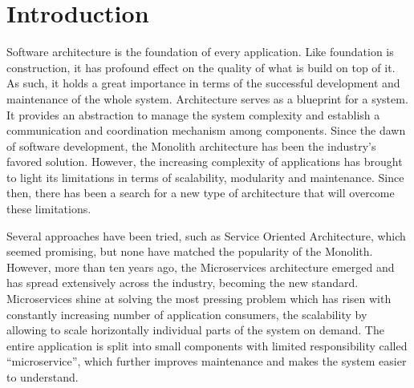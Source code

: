 
\chapter*{Introduction}
\setcounter{page}{1}

Software architecture is the foundation of every application. Like foundation is construction, it has profound effect on the quality of what is build on top of it. As such, it holds a great importance in terms of the successful development and maintenance of the whole system. Architecture serves as a blueprint for a system. It provides an abstraction to manage the system complexity and establish a communication and coordination mechanism among components. Since the dawn of software development, the Monolith architecture has been the industry's favored solution.  However, the increasing complexity of applications has brought to light its limitations in terms of scalability, modularity and maintenance. Since then, there has been a search for a new type of architecture that will overcome these limitations.

Several approaches have been tried, such as Service Oriented Architecture, which seemed promising, but none have matched the popularity of the Monolith. However, more than ten years ago, the Microservices architecture emerged and has spread extensively across the industry, becoming the new standard. Microservices shine at solving the most pressing problem which has risen with constantly increasing number of application consumers, the scalability by allowing to scale horizontally individual parts of the system on demand. The entire application is split into small components with limited responsibility called ``microservice'', which further improves maintenance and makes the system easier to understand.

